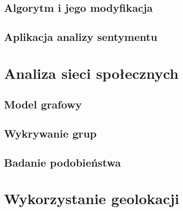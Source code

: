 \subsection{Algorytm i jego modyfikacja}
\subsection{Aplikacja analizy sentymentu}



\section{Analiza sieci społecznych}
\label{section:siecispoleczne}
\subsection{Model grafowy}
\subsection{Wykrywanie grup}
\subsection{Badanie podobieństwa}




\section{Wykorzystanie geolokacji}
\label{section:wykorzystaniegeolokacji}
